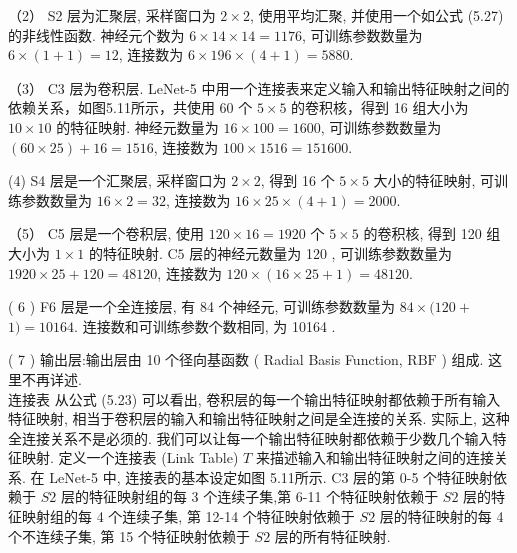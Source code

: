 \documentclass[10pt]{article}
\begin{document}
（2） S2 层为汇聚层, 采样窗口为 $2 \times 2$, 使用平均汇聚, 并使用一个如公式 (5.27) 的非线性函数. 神经元个数为 $6 \times 14 \times 14=1176$, 可训练参数数量为 $6 \times(1+1)=12$, 连接数为 $6 \times 196 \times(4+1)=5880$.

（3） C3 层为卷积层. LeNet-5 中用一个连接表来定义输入和输出特征映射之间的依赖关系，如图5.11所示，共使用 60 个 $5 \times 5$ 的卷积核，得到 16 组大小为 $10 \times 10$ 的特征映射. 神经元数量为 $16 \times 100=1600$, 可训练参数数量为 $(60 \times 25)+16=1516$, 连接数为 $100 \times 1516=151600$.

(4) S4 层是一个汇聚层, 采样窗口为 $2 \times 2$, 得到 16 个 $5 \times 5$ 大小的特征映射, 可训练参数数量为 $16 \times 2=32$, 连接数为 $16 \times 25 \times(4+1)=2000$.

（5） C5 层是一个卷积层, 使用 $120 \times 16=1920$ 个 $5 \times 5$ 的卷积核, 得到 120 组大小为 $1 \times 1$ 的特征映射. $\mathrm{C} 5$ 层的神经元数量为 120 , 可训练参数数量为 $1920 \times 25+120=48120$, 连接数为 $120 \times(16 \times 25+1)=48120$.

( 6 ) F6 层是一个全连接层, 有 84 个神经元, 可训练参数数量为 $84 \times(120+$ $1)=10164$. 连接数和可训练参数个数相同, 为 10164 .

( 7 ) 输出层:输出层由 10 个径向基函数 ( Radial Basis Function, $\mathrm{RBF}$ ) 组成. 这里不再详述.\\
连接表 从公式 (5.23) 可以看出, 卷积层的每一个输出特征映射都依赖于所有输入特征映射, 相当于卷积层的输入和输出特征映射之间是全连接的关系. 实际上, 这种全连接关系不是必须的. 我们可以让每一个输出特征映射都依赖于少数几个输入特征映射. 定义一个连接表 (Link Table) $T$ 来描述输入和输出特征映射之间的连接关系. 在 LeNet-5 中, 连接表的基本设定如图 5.11所示. C3 层的第 0-5 个特征映射依赖于 $S 2$ 层的特征映射组的每 3 个连续子集,第 6-11 个特征映射依赖于 $S 2$ 层的特征映射组的每 4 个连续子集, 第 12-14 个特征映射依赖于 $S 2$ 层的特征映射的每 4 个不连续子集, 第 15 个特征映射依赖于 $S 2$ 层的所有特征映射.
\end{document}
